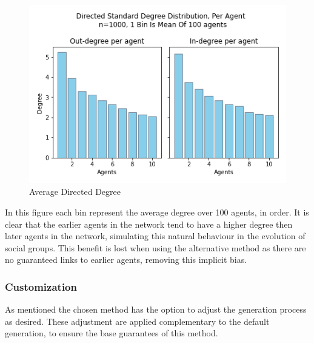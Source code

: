 \documentclass{article}
\begin{document}
\begin{center}
    \begin{figure}[!htbp]
        \centering
        \includegraphics[width=.8\textwidth]{ThesisKI/Images/DirectedStandardPerAgent.png}
        \caption{Average Directed Degree}
        \label{degree:agent}
    \end{figure}
\end{center}

\noindent In this figure each bin represent the average degree over 100 agents, in order. It is clear that the earlier agents in the network tend to have a higher degree then later agents in the network, simulating this natural behaviour in the evolution of social groups. This benefit is lost when using the alternative method as there are no guaranteed links to earlier agents, removing this implicit bias.

\subsubsection{Customization}

As mentioned the chosen method has the option to adjust the generation process as desired. These adjustment are applied complementary to the default generation, to ensure the base guarantees of this method. \newline
\end{document}
